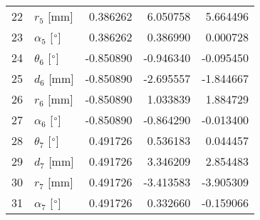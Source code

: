 \documentclass{standalone}%
\begin{document}
\begin{tabular}{llrrr}
22 &              $r_{5}$ [mm] &  0.386262 &   6.050758 &   5.664496 \\
23 &  $\alpha_{5}$ [$\degree$] &  0.386262 &   0.386990 &   0.000728 \\
24 &  $\theta_{6}$ [$\degree$] & -0.850890 &  -0.946340 &  -0.095450 \\
25 &              $d_{6}$ [mm] & -0.850890 &  -2.695557 &  -1.844667 \\
26 &              $r_{6}$ [mm] & -0.850890 &   1.033839 &   1.884729 \\
27 &  $\alpha_{6}$ [$\degree$] & -0.850890 &  -0.864290 &  -0.013400 \\
28 &  $\theta_{7}$ [$\degree$] &  0.491726 &   0.536183 &   0.044457 \\
29 &              $d_{7}$ [mm] &  0.491726 &   3.346209 &   2.854483 \\
30 &              $r_{7}$ [mm] &  0.491726 &  -3.413583 &  -3.905309 \\
31 &  $\alpha_{7}$ [$\degree$] &  0.491726 &   0.332660 &  -0.159066 \\
\bottomrule
\end{tabular}
%
\end{document}
